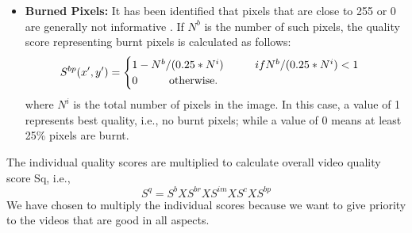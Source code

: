 \documentclass{sig-alternate}
\newcommand\tab[1][1cm]{\hspace*{#1}}
\begin{document}
\begin{itemize}
\item \textbf{Burned Pixels:} It has been identiﬁed that pixels that are close to 255 or 0 are generally not informative \cite{wyszecki1982color}. If \(N^b\) is the number of such pixels, the quality score representing burnt pixels is calculated as follows: 
\begin{equation}
S^{bp}(x',y')=
\begin{cases}
1 - N^b/(0.25*N^i)\tab if N^b/(0.25*N^i) < 1 \\
0 \tab  \text{otherwise}. 
\end{cases}
\end{equation}
where \(N^i\) is the total number of pixels in the image. In this case, a value of 1 represents best quality, i.e., no burnt pixels; while a value of 0 means at least 25\% pixels are burnt.
\end{itemize} 
The individual quality scores are multiplied to calculate overall video quality score Sq, i.e.,
\begin{equation}
S^q = S^b X S^{br} X S^{im} X S^c X S^{bp} 
\end{equation}
We have chosen to multiply the individual scores because we want to give priority to the videos that are good in all aspects. 
\end{document}
